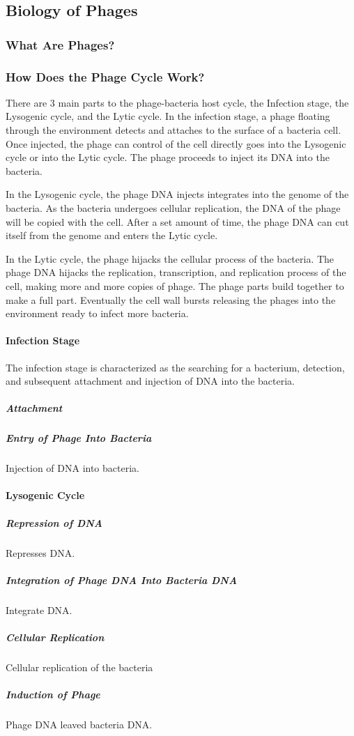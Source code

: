 \subsection{Biology of Phages}
\subsubsection{What Are Phages?}

\subsubsection{How Does the Phage Cycle Work?}
There are 3 main parts to the phage-bacteria host cycle, the Infection stage, the Lysogenic cycle, and the Lytic cycle. 
In the infection stage, a phage floating through the environment detects and attaches to the surface of a bacteria cell. 
Once injected, the phage can control of the cell directly goes into the Lysogenic cycle or into the Lytic cycle. 
The phage proceeds to inject its DNA into the bacteria. 
\newline 

In the Lysogenic cycle, the phage DNA injects integrates into the genome of the bacteria. 
As the bacteria undergoes cellular replication, the DNA of the phage will be copied with the cell. 
After a set amount of time, the phage DNA can cut itself from the genome and enters the Lytic cycle.
\newline 

In the Lytic cycle, the phage hijacks the cellular process of the bacteria. 
The phage DNA hijacks the replication, transcription, and replication process of the cell, making more and more copies of phage. 
The phage parts build together to make a full part. 
Eventually the cell wall bursts releasing the phages into the environment ready to infect more bacteria. 

\paragraph{Infection Stage}
The infection stage is characterized as the searching for a bacterium, detection, and subsequent attachment and injection of DNA into the bacteria. 
\subparagraph{Attachment}


\subparagraph{Entry of Phage Into Bacteria}
Injection of DNA into bacteria. 

\paragraph{Lysogenic Cycle}
\subparagraph{Repression of DNA}
Represses DNA. 
\subparagraph{Integration of Phage DNA Into Bacteria DNA}
Integrate DNA. 
\subparagraph{Cellular Replication}
Cellular replication of the bacteria
\subparagraph{Induction of Phage}
Phage DNA leaved bacteria DNA. 

